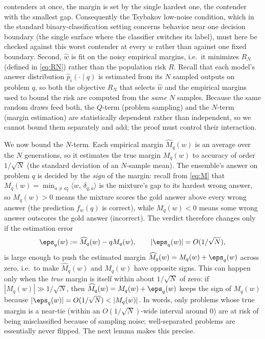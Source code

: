 \documentclass{article} %
\providecommand{\Risk}{R}
\providecommand{\ip}[2]{\langle #1,\, #2\rangle}
\providecommand{\phat}{\widehat{p}}
\providecommand{\Mhat}{\widehat{M}}
\providecommand{\what}{\widehat{w}}
\begin{document}
contenders at once, the margin is set by the single hardest one, the contender
with the smallest gap. Consequently the
Tsybakov low-noise condition, which in the standard binary-classification setting
concerns behavior near one decision boundary (the single surface where the
classifier switches its label), must here be checked against this worst contender
at every $w$ rather than against one fixed boundary.
Second, $\what$ is fit on the noisy empirical margins, i.e.\ it minimizes
$\Risk_N$ (defined in \eqref{eq:RN}) rather than the population risk $\Risk$.
Recall that each model's answer distribution $\phat_i(\cdot\mid q)$ is estimated
from its $N$ sampled outputs on problem $q$, so both the objective $\Risk_N$ that
selects $\what$ and the empirical margins used to bound the risk are computed from
the \emph{same} $N$ samples. Because the same
random draws feed both, the $Q$-term (problem sampling) and the $N$-term (margin
estimation) are statistically dependent rather than independent, so we cannot
bound them separately and add; the proof must control their interaction.

We now bound the $N$-term. Each empirical margin $\Mhat_q(w)$ is an average over
the $N$ generations, so it estimates the true margin $M_q(w)$ to accuracy of
order $1/\sqrt N$ (the standard deviation of an $N$-sample mean). The ensemble's
answer on problem $q$ is decided by the \emph{sign} of the margin: recall from
\eqref{eq:M} that $M_q(w)=\min_{a\ne a_q^\star}\ip{w}{\delta_{q,a}}$ is the
mixture's gap to its hardest wrong answer, so $M_q(w)>0$ means the mixture scores
the gold answer above every wrong answer (the prediction $f_w(q)$ is correct),
while $M_q(w)<0$ means some wrong answer outscores the gold answer (incorrect).
The verdict therefore changes only if the estimation error
\begin{equation}
\label{eq:margin-error}
\eps_q(w) := \Mhat_q(w) -q M_q(w), \qquad |\eps_q(w)| = O(1/\sqrt N),
\end{equation}
is large enough to push the estimated margin $\Mhat_q(w)=M_q(w)+\eps_q(w)$ across
zero, i.e.\ to make $\Mhat_q(w)$ and $M_q(w)$ have opposite signs. This can happen
only when the \emph{true} margin is itself within about $1/\sqrt N$ of zero: if
$|M_q(w)|\gg 1/\sqrt N$, then $\Mhat_q(w)=M_q(w)+\eps_q(w)$ keeps the sign of
$M_q(w)$ because $|\eps_q(w)|=O(1/\sqrt N)<|M_q(w)|$. In words, only problems
whose true margin is a near-tie (within an $O(1/\sqrt N)$-wide interval around
$0$) are at risk of being misclassified because of sampling noise; well-separated
problems are essentially never flipped. The next lemma makes this precise.
\end{document}
